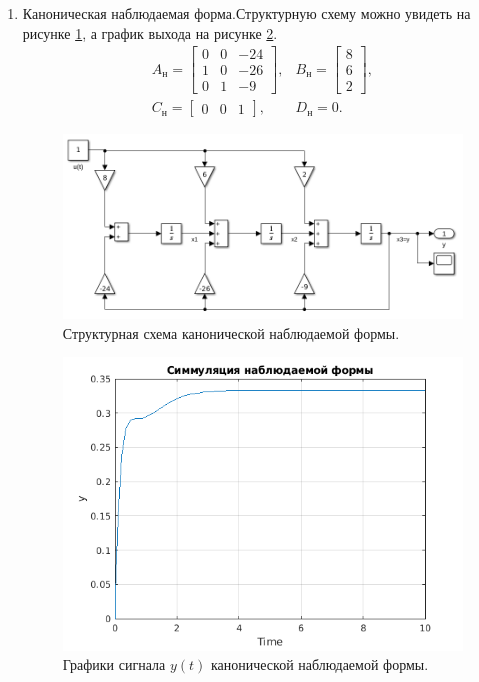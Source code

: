 \begin{enumerate}
    \item Каноническая наблюдаемая форма.Структурную схему можно увидеть
    на рисунке \ref{fig:task2_slx_wtch}, а график выхода на рисунке 
    \ref{fig:task2_out_wtch_y}.
    \begin{equation*}
        \begin{array}{cc}
            A_\text{н}=\begin{bmatrix}
                0 & 0 & -24 \\
                1 & 0 & -26 \\
                0 & 1 & -9
            \end{bmatrix}, &
            B_\text{н}=\begin{bmatrix}
                8 \\ 6 \\ 2
            \end{bmatrix}, \\[7mm]
            C_\text{н}=\begin{bmatrix}
                0 & 0 & 1
            \end{bmatrix}, &
            D_\text{н}=0.
        \end{array}
    \end{equation*}
    \begin{figure}[htbp]
        \centering
        \includegraphics[width=\linewidth]{figs/task_2_slx_wtch.png}
        \caption{Структурная схема канонической наблюдаемой формы.}
        \label{fig:task2_slx_wtch}
    \end{figure}
    \begin{figure}[htbp]
        \centering
        \includegraphics[width=0.7\linewidth]{figs/task_2_out_wtch_y.png}
        \caption{Графики сигнала $y(t)$ канонической наблюдаемой формы.}
        \label{fig:task2_out_wtch_y}
    \end{figure}


\end{enumerate}

